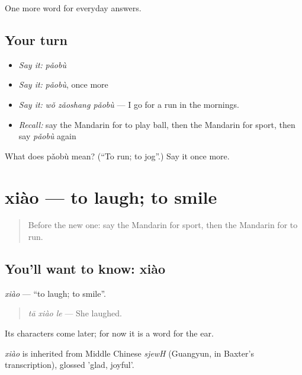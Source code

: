 \begin{grammarlens}[title={What you've built}]
One more word for everyday answers.
\end{grammarlens}

\subsection*{Your turn}
\begin{itemize}
\raggedright
  \item \emph{Say it:} \emph{pǎobù}
  \item \emph{Say it:} \emph{pǎobù}, once more
  \item \emph{Say it:} \emph{wǒ zǎoshang pǎobù} — I go for a run in the mornings.
  \item \emph{Recall:} say the Mandarin for to play ball, then the Mandarin for sport, then say \emph{pǎobù} again
\end{itemize}

\begin{tcolorbox}[breakable,colback=teal!4,colframe=teal!35!black,title={Before you move on}]
What does pǎobù mean? (\textquotedblleft{}To run; to jog\textquotedblright{}.) Say it once more.
\end{tcolorbox}
\section[xiào]{xiào — to laugh; to smile}

\label{lesson:ZH-C56-xiao}



\begin{quote}
Before the new one: say the Mandarin for sport, then the Mandarin for to run.
\end{quote}

\subsection*{You'll want to know: xiào}
\emph{xiào} — \textquotedblleft{}to laugh; to smile\textquotedblright{}.

\begin{quote}
\emph{tā xiào le} — She laughed.
\end{quote}

Its characters come later; for now it is a word for the ear.

\begin{cousinweb}
\emph{xiào} is inherited from Middle Chinese \emph{sjewH} (Guangyun, in Baxter's transcription), glossed 'glad, joyful'.
\end{cousinweb}


